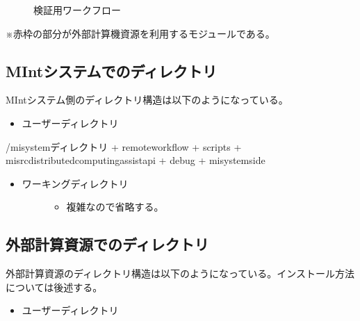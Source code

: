 \documentclass[letterpaper,10pt,dvipdfmx,openany]{sphinxmanual}
\begin{document}
\begin{figure}[htbp]
\centering
\capstart

\noindent{}
\caption{検証用ワークフロー}\label{\detokenize{using_distributed_properties:id47}}\end{figure}

※赤枠の部分が外部計算機資源を利用するモジュールである。

\newpage


\subsection{MIntシステムでのディレクトリ}
\label{\detokenize{using_distributed_properties:id20}}
MIntシステム側のディレクトリ構造は以下のようになっている。
\begin{itemize}
\item {} 
ユーザーディレクトリ

\end{itemize}

\begin{sphinxVerbatim}[commandchars=\\\{\}]
\PYGZti{}/misystemディレクトリ
 + remote\PYGZus{}workflow
   + scripts
 + misrc\PYGZus{}distributed\PYGZus{}computing\PYGZus{}assist\PYGZus{}api
   + debug
     + mi\PYGZhy{}system\PYGZhy{}side
\end{sphinxVerbatim}
\begin{itemize}
\item {} \begin{description}
\item[{ワーキングディレクトリ}] \leavevmode\begin{itemize}
\item {} 
複雑なので省略する。

\end{itemize}

\end{description}

\end{itemize}


\subsection{外部計算資源でのディレクトリ}
\label{\detokenize{using_distributed_properties:id21}}
外部計算資源のディレクトリ構造は以下のようになっている。インストール方法については後述する。
\begin{itemize}
\item {} 
ユーザーディレクトリ

\end{itemize}
\end{document}
